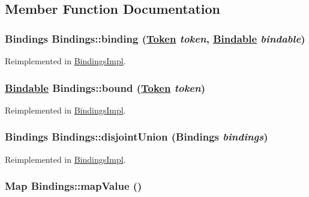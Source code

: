 \subsection{Member Function Documentation}
\hypertarget{interfaceBindings_a1}{
\subsubsection[binding]{\setlength{\rightskip}{0pt plus 5cm}Bindings Bindings::binding (\hyperlink{interfaceToken}{Token} {\em token}, \hyperlink{interfaceBindable}{Bindable} {\em bindable})}}
\label{interfaceBindings_a1}




Reimplemented in \hyperlink{classBindingsImpl_a1}{Bindings\-Impl}.\hypertarget{interfaceBindings_a2}{
\subsubsection[bound]{\setlength{\rightskip}{0pt plus 5cm}\hyperlink{interfaceBindable}{Bindable} Bindings::bound (\hyperlink{interfaceToken}{Token} {\em token})}}
\label{interfaceBindings_a2}




Reimplemented in \hyperlink{classBindingsImpl_a2}{Bindings\-Impl}.\hypertarget{interfaceBindings_a4}{
\subsubsection[disjointUnion]{\setlength{\rightskip}{0pt plus 5cm}Bindings Bindings::disjoint\-Union (Bindings {\em bindings})}}
\label{interfaceBindings_a4}




Reimplemented in \hyperlink{classBindingsImpl_a4}{Bindings\-Impl}.\hypertarget{interfaceBindings_a0}{
\subsubsection[mapValue]{\setlength{\rightskip}{0pt plus 5cm}Map Bindings::map\-Value ()}}
\label{interfaceBindings_a0}




